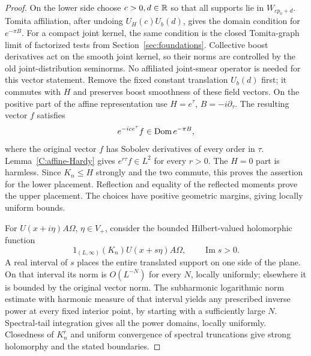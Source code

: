 \begin{proof}
On the lower side choose $c>0,d\in\mathbb R$ so that all supports lie
in $W_{cp_0+d}$. Tomita affiliation, after undoing
$U_H(c)U_b(d)$, gives the domain condition for $e^{-\pi B}$.
For a compact joint kernel, the same condition is the closed
Tomita-graph limit of factorized tests from
Section~\ref{sec:foundations}.  Collective boost derivatives act on
the smooth joint kernel, so their norms are controlled by the old
joint-distribution seminorms.  No affiliated joint-smear operator is
needed for this vector statement.
Remove the fixed constant translation $U_b(d)$ first; it commutes
with $H$ and preserves boost smoothness of these field vectors.
On the positive part of the affine representation use
$H=e^\tau$, $B=-i\partial_\tau$. The resulting vector $f$ satisfies
\[
 e^{-ice^\tau}f\in\operatorname{Dom} e^{-\pi B},
\]
where the original vector $f$ has Sobolev derivatives of every
order in $\tau$. Lemma~\ref{C:affine-Hardy} gives
$e^{r\tau}f\in L^2$ for every $r>0$. The $H=0$ part is
harmless. Since $K_n\le H$ strongly and the two commute, this
proves the assertion for the lower placement. Reflection and
equality of the reflected moments prove the upper placement.
The choices have positive geometric margins, giving locally
uniform bounds.

For $U(x+i\eta)A\Omega$, $\eta\in V_+$, consider the bounded
Hilbert-valued holomorphic function
\[
 1_{(L,\infty)}(K_n)U(x+s\eta)A\Omega,
 \qquad \operatorname{Im}s>0.
\]
A real interval of $s$ places the entire translated support on
one side of the plane. On that interval its norm is $O(L^{-N})$
for every $N$, locally uniformly; elsewhere it is bounded by
the original vector norm. The subharmonic logarithmic norm
estimate with harmonic measure of that interval yields any
prescribed inverse power at every fixed interior point, by
starting with a sufficiently large $N$. Spectral-tail
integration gives all the power domains, locally uniformly.
Closedness of $K_n^r$ and uniform convergence of spectral
truncations give strong holomorphy and the stated boundaries.
\end{proof}

